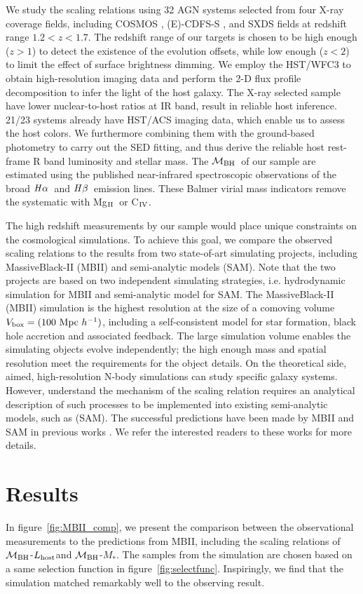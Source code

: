 \documentclass{natureprintstyle}
\newcommand{\mbh}{$\mathcal M_{\rm BH}$}
\newcommand{\lhost}{$L_{\rm host}$}
\newcommand{\halpha}{${\it H}\alpha$}
\newcommand{\hbeta}{${\it H}\beta$}
\newcommand{\mstar}{{$M_*$}}
\newcommand{\Mgii}{Mg$_{\rm II}$}
\newcommand{\Civ}{C$_{\rm IV}$}
\begin{document}
We study the scaling relations using 32 AGN systems selected from four X-ray coverage fields, including COSMOS \cite{Civano2016}, (E)-CDFS-S \cite{Lehmer2005, Xue2011}, and SXDS \cite{Ueda2008} fields at redshift range $1.2<z<1.7$. The redshift range of our targets is chosen to be high enough ($z>1$) to detect the existence of the evolution offsets, while low enough ($z<2$) to limit the effect of surface brightness dimming.
We employ the HST/WFC3 to obtain high-resolution imaging data and perform the 2-D flux profile decomposition to infer the light of the host galaxy. The X-ray selected sample have lower nuclear-to-host ratios at IR band, result in reliable host inference. 21/23 systems already have HST/ACS imaging data, which enable us to assess the host colors. We furthermore combining them with the ground-based photometry to carry out the SED fitting, and thus derive the reliable host rest-frame R band luminosity and stellar mass. The \mbh\ of our sample are estimated using the published near-infrared spectroscopic observations of the broad \halpha\ and \hbeta\ emission lines. These Balmer virial mass indicators remove the systematic with \Mgii\ or \Civ.

The high redshift measurements by our sample would place unique constraints on the cosmological simulations. To achieve this goal, we compare the observed scaling relations to the results from two state-of-art simulating projects, including MassiveBlack-II (MBII) and semi-analytic models (SAM). Note that the two projects are based on two independent simulating strategies, i.e. hydrodynamic simulation for MBII and semi-analytic model for SAM. The MassiveBlack-II (MBII) simulation is the highest resolution at the size of a comoving volume $V_{\rm box} = (100~{\rm Mpc}~h^{-1})$, including a self-consistent model for star formation, black hole accretion and associated feedback. The large simulation volume enables the simulating objects evolve independently; the high enough mass and spatial resolution meet the requirements for the object details. On the theoretical side, aimed, high-resolution N-body simulations can study specific galaxy systems. However, understand the mechanism of the scaling relation requires an analytical description of such processes to be implemented into existing semi-analytic models, such as (SAM). 
The successful predictions have been made by MBII and SAM in previous works \cite{Menci2014, Menci2016, Khandai2015}. We refer the interested readers to these works for more details.

\section{Results}
In figure~\ref{fig:MBII_comp}, we present the comparison between the observational measurements to the predictions from MBII, including the scaling relations of \mbh-\lhost and \mbh-\mstar. The samples from the simulation are chosen based on a same selection function in figure~\ref{fig:selectfunc}. Inspiringly, we find that the simulation matched remarkably well to the observing result. 
\end{document}
